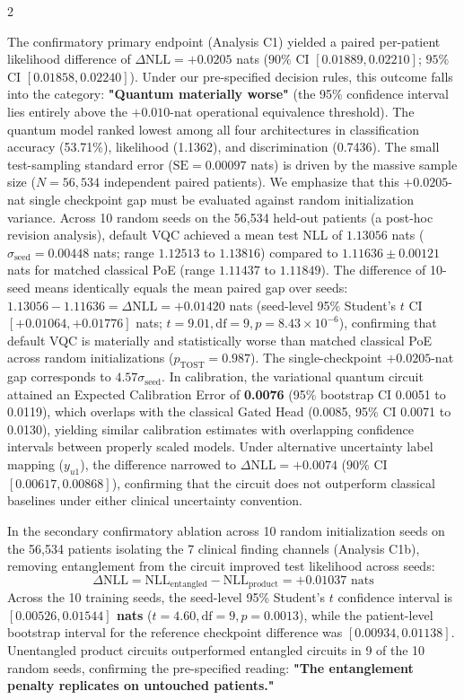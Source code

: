 \documentclass[10pt,a4paper,twoside]{article}
\begin{document}
\begin{multicols}{2}

The confirmatory primary endpoint (Analysis C1) yielded a paired per-patient likelihood difference of $\Delta\text{NLL} = \mathbf{+0.0205}$ nats ($90\%$ CI $[0.01889, 0.02210]$; $95\%$ CI $[0.01858, 0.02240]$). Under our pre-specified decision rules, this outcome falls into the category: \textbf{"Quantum materially worse"} (the 95\% confidence interval lies entirely above the $+0.010$-nat operational equivalence threshold). The quantum model ranked lowest among all four architectures in classification accuracy (53.71\%), likelihood (1.1362), and discrimination (0.7436). The small test-sampling standard error ($\text{SE} = 0.00097$ nats) is driven by the massive sample size ($N = 56,534$ independent paired patients). We emphasize that this $+0.0205$-nat single checkpoint gap must be evaluated against random initialization variance. Across 10 random seeds on the 56,534 held-out patients (a post-hoc revision analysis), default VQC achieved a mean test NLL of $1.13056$ nats ($\sigma_{\text{seed}} = 0.00448$ nats; range $1.12513$ to $1.13816$) compared to $1.11636 \pm 0.00121$ nats for matched classical PoE (range $1.11437$ to $1.11849$). The difference of 10-seed means identically equals the mean paired gap over seeds: $1.13056 - 1.11636 = \Delta\text{NLL} = \mathbf{+0.01420}$ nats (seed-level 95\% Student's $t$ CI $[+0.01064, +0.01776]$ nats; $t = 9.01, \text{df} = 9, p = 8.43 \times 10^{-6}$), confirming that default VQC is materially and statistically worse than matched classical PoE across random initializations ($p_{\text{TOST}} = 0.987$). The single-checkpoint $+0.0205$-nat gap corresponds to $4.57 \sigma_{\text{seed}}$. In calibration, the variational quantum circuit attained an Expected Calibration Error of \textbf{0.0076} (95\% bootstrap CI 0.0051 to 0.0119), which overlaps with the classical Gated Head (0.0085, 95\% CI 0.0071 to 0.0130), yielding similar calibration estimates with overlapping confidence intervals between properly scaled models. Under alternative uncertainty label mapping ($y_{u1}$), the difference narrowed to $\Delta\text{NLL} = +0.0074$ ($90\%$ CI $[0.00617, 0.00868]$), confirming that the circuit does not outperform classical baselines under either clinical uncertainty convention.

In the secondary confirmatory ablation across 10 random initialization seeds on the 56,534 patients isolating the 7 clinical finding channels (Analysis C1b), removing entanglement from the circuit improved test likelihood across seeds:
\begin{equation}
\Delta\text{NLL} = \text{NLL}_{\text{entangled}} - \text{NLL}_{\text{product}} = \mathbf{+0.01037} \text{ nats}
\end{equation}
Across the 10 training seeds, the seed-level 95\% Student's $t$ confidence interval is \textbf{$[0.00526, 0.01544]$ nats} ($t = 4.60, \text{df} = 9, p = 0.0013$), while the patient-level bootstrap interval for the reference checkpoint difference was $[0.00934, 0.01138]$. Unentangled product circuits outperformed entangled circuits in 9 of the 10 random seeds, confirming the pre-specified reading: \textbf{"The entanglement penalty replicates on untouched patients."}


\end{multicols}
\end{document}
